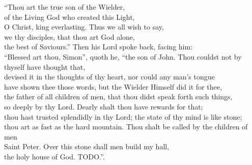 \bvb “Thou art the true son of the Wielder, \\
of the Living God who created this Light, \\
O Christ, king everlasting.  Thus we all wish to say, \\
we thy disciples, that thou art God alone, \\
the best of Saviours.”  Then his Lord spoke back, facing him: \\
“Blessed art thou, Simon”, quoth he, “the son of John.  Thou couldst not by thyself have thought that, \\
devised it in the thoughts of thy heart, nor could any man’s tongue \\
have shown thee those words, but the Wielder Himself did it for thee, \\
the father of all children of men, that thou didst speak forth such things, \\
so deeply by thy Lord.  Dearly shalt thou have rewards for that; \\
thou hast trusted splendidly in thy Lord; the state of thy mind is like stone; \\
thou art as fast as the hard mountain.  Thou shalt be called by the children of men \\
Saint Peter.  Over this stone shall men build my hall, \\
the holy house of God.  TODO.”.\evb\evg

